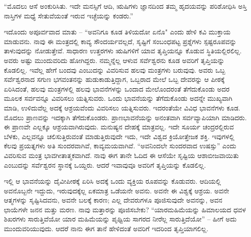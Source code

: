 “ಮೊದಲು ಆಸೆ ಅಂಕುರಿಸಿತು. ಇದೇ ಮನಸ್ಸಿಗೆ ಆದಿ, ಋಷಿಗಳು ಜ್ಞಾನದಿಂದ ತಮ್ಮ ಹೃದಯವನ್ನು ಪರಿಶೋಧಿಸಿ ಅಸ್ತಿ ನಾಸ್ತಿಗಳ ಮಧ್ಯೆ ಸೇತುವೆಯಂತೆ ಇರುವ ಇಚ್ಛೆಯನ್ನು ಕಂಡರು.”

ಇದೊಂದು ಅಪೂರ್ವವಾದ ಮಾತು – “ಅವನಿಗೂ ಕೂಡ ತಿಳಿಯದೋ ಏನೊ" ಎಂದು ಹೇಳಿ ಕವಿ ಮುಕ್ತಾಯ ಮಾಡುವನು. ನಾವು ಈ ಮಂತ್ರದಲ್ಲಿ ಕಾವ್ಯ ಸೌಂದರ್ಯವಲ್ಲದೆ, ಸೃಷ್ಟಿಗೆ ಸಂಬಂಧಪಟ್ಟ ಪ್ರಶ್ನೆಗಳು ಸ್ಪಷ್ಟರೂಪವನ್ನು ತಾಳುವುದನ್ನು ನೋಡುತ್ತೇವೆ. ಸಾಧಾರಣ ಉತ್ತರಗಳು ಋಷಿಗಳಿಗೆ ಯಾವ ತೃಪ್ತಿಯನ್ನೂ ಕೊಡುವ ಸ್ಥಿತಿಯಲ್ಲಿರಲಿಲ್ಲ. ಅವರು ಅಷ್ಟು ಮುಂದುವರಿದು ಹೋಗಿದ್ದರು. ನಮ್ಮನ್ನೆಲ್ಲ ಆಳುವ ಸರ್ವೆಶ್ವರನು ಕೂಡ ಅವರಿಗೆ ತೃಪ್ತಿಯನ್ನು ಕೊಡಲಿಲ್ಲ. ಇವೆಲ್ಲ ಹೇಗೆ ಬಂದವು ಎಂಬುದನ್ನು ವಿವರಿಸುವ ಹಲವು ಮಂತ್ರಗಳು ಬರುವುವು. ಅವರು ಒಬ್ಬ ಸರ್ವೆಶ್ವರನಾದ ಸಗುಣ ಭಗವಂತನನ್ನು ಹುಡುಕಾಡುತ್ತಿದ್ದಾಗ, ಒಬ್ಬರಾದ ಮೇಲೆ ಒಬ್ಬ ದೇವರನ್ನು ಆ ಪೀಠಕ್ಕೆ ಏರಿಸಿದಂತೆ, ಹಲವು ಮಂತ್ರಗಳಲ್ಲಿ ಹಲವು ಭಾವನೆಗಳನ್ನು ಒಂದಾದ ಮೇಲೊಂದರಂತೆ ತೆಗೆದುಕೊಂಡು ಅದರ ಮೂಲಕ ಸರ್ವವನ್ನೂ ವಿವರಿಸಲು ಯತ್ನಿಸುವರು. ಒಂದು ಭಾವನೆಯನ್ನು ತೆಗೆದುಕೊಂಡು ಅದನ್ನೇ ಮುಖ್ಯವಾಗಿ ಮಾಡಿ, ಉಳಿದುವೆಲ್ಲ ಅದಕ್ಕೆ ಆಶ್ರಯವೆಂದು ವಿವರಿಸಲು ಯತ್ನಿಸುವರು. ಇದರಂತೆಯೇ ವಿವಿಧ ಭಾವನೆಗಳು ಕೂಡ. ಮೊದಲು ಪ್ರಾಣವನ್ನು ಇದಕ್ಕಾಗಿ ತೆಗೆದುಕೊಂಡರು. ಪ್ರಾಣಭಾವನೆಯನ್ನು ಅನಂತವಾಗಿ ಸರ್ವವ್ಯಾಪಿಯಾಗಿ ಮಾಡಿದರು. ಈ ಪ್ರಾಣವೇ ಎಲ್ಲಕ್ಕೂ ಆಶ್ರಯವಾಗಿರುವುದು. ಮನುಷ್ಯನ ದೇಹಕ್ಕೆ ಮಾತ್ರವಲ್ಲ. ಇದೇ ಸೂರ್ಯ ಚಂದ್ರರಲ್ಲಿರುವ ಬೆಳಕು, ಎಲ್ಲವನ್ನೂ ಚಲಿಸುತ್ತಿರುವಂತೆ ಮಾಡುತ್ತಿರುವುದೇ ಇದು, ಇದೇ ವಿಶ್ವದ ಕ್ರಿಯೋತ್ತೇಜಕ ಶಕ್ತಿ. ಇವುಗಳಲ್ಲಿ ಕೆಲವು ಪ್ರಯತ್ನಗಳು ಅತಿ ಸುಂದರವಾಗಿವೆ, ಕಾವ್ಯಮಯವಾಗಿವೆ. “ಅವನಿಂದಲೇ ಸುಂದರವಾದ ಉಷಸ್ಸು” ಎಂದು ವಿವರಿಸುವ ಮಂತ್ರ ಭಾವಗೀತಾತ್ಮಕವಾಗಿದೆ. ನಾವು ಈಗ ತಾನೇ ಓದಿದ ಈ ಆಸೆಯೇ ಸೃಷ್ಟಿಯ ಆಶಾಬೀಜವಾಯಿತು ಎಂಬುದನ್ನು ಸರ್ವೆಶ್ವರನ ಸ್ಥಾನಕ್ಕೆ ಒಯ್ದರು. ಆದರೆ ಇವಾವುವೂ ಅವರಿಗೆ ತೃಪ್ತಿಯನ್ನು ಕೊಡಲಿಲ್ಲ.

ಇಲ್ಲಿ ಆ ಭಾವನೆಯನ್ನು ದೈವೀಪೀಠಕ್ಕೆ ಏರಿಸಿ ಅದಕ್ಕೆ ಒಂದು ವ್ಯಕ್ತಿಯ ರೂಪವನ್ನು ಕೊಡುವರು. ಆದಿಯಲ್ಲಿ ಅವನೊಬ್ಬನೇ ಇದ್ದುದು, ಇರುವುದಕ್ಕೆಲ್ಲ ಏಕಮಾತ್ರ ಒಡೆಯನೇ ಅವನು. ಅವನೇ ಈ ವಿಶ್ವಕ್ಕೆ ಆಶ್ರಯ. ಅವನೇ ಆತ್ಮಗಳನ್ನು ಸೃಷ್ಟಿಸಿದವನು, ಅವನೇ ಬಲಕ್ಕೆ ಕಾರಣ; ಎಲ್ಲ ದೇವರುಗಳೂ ಪೂಜಿಸುವುದೇ ಅವನನ್ನು, ಅವನ ಛಾಯೆಗಳೇ ಜನನ ಮತ್ತು ಮರಣ. ನಾವು ಮತ್ತಾರನ್ನು ಪೂಜಿಸಬೇಕು? “ಯಾರ\break ಮಹಿಮೆಯನ್ನು ಹಿಮಾಲಯದ ಧವಳ ಶಿಖರಗಳು ಸಾರುತ್ತಿವೆಯೋ ಯಾರ ಮಹಿಮೆಯನ್ನು ಪೃಥ್ವಿಯ ಸಾಗರದ ನೀರೆಲ್ಲ ಸಾರುತ್ತಿದೆಯೋ'' – ಹೀಗೆ ಅದು ಮುಂದುವರಿಯುವುದು. ಆದರೆ ನಾನು ಈಗ ತಾನೆ ಹೇಳಿದಂತೆ ಅವರಿಗೆ ಇದರಿಂದ ತೃಪ್ತಿಯಾಗಲಿಲ್ಲ.


